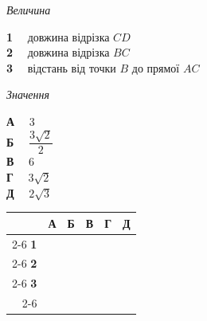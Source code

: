 \documentclass[12pt]{article}
\newcommand{\matchingGrid}{%
    \begingroup
    \renewcommand{\arraystretch}{1.15}
    \setlength{\tabcolsep}{4pt}
    \footnotesize
    \begin{tabular}{r|c|c|c|c|c|}
         \multicolumn{1}{c}{} & \multicolumn{1}{c}{\textbf{А}} & \multicolumn{1}{c}{\textbf{Б}} & \multicolumn{1}{c}{\textbf{В}} & \multicolumn{1}{c}{\textbf{Г}} & \multicolumn{1}{c}{\textbf{Д}} \\ \cline{2-6}
         \textbf{1} & \phantom{X} & \phantom{X} & \phantom{X} & \phantom{X} & \phantom{X} \\ \cline{2-6}
         \textbf{2} & & & & & \\ \cline{2-6}
         \textbf{3} & & & & & \\ \cline{2-6}
    \end{tabular}
    \endgroup
}
\begin{document}
{\noindent
\begin{minipage}[t]{0.52\textwidth}
\textit{Величина} \par \vspace{0.2cm}
\textbf{1} \ \ довжина відрізка $CD$\\[0.25cm]
\textbf{2} \ \ довжина відрізка $BC$\\[0.25cm]
\textbf{3} \ \ відстань від точки $B$ до прямої $AC$
\end{minipage}
\begin{minipage}[t]{0.28\textwidth}
\textit{Значення} \par \vspace{0.2cm}
\textbf{А} \ \ $3$\\[0.15cm]
\textbf{Б} \ \ $\dfrac{3\sqrt{2}}{2}$\\[0.15cm]
\textbf{В} \ \ $6$\\[0.15cm]
\textbf{Г} \ \ $3\sqrt{2}$\\[0.15cm]
\textbf{Д} \ \ $2\sqrt{3}$
\end{minipage}
\hfill
\begin{minipage}[t]{0.22\textwidth}
\vspace{-0.2cm}
\begin{flushright}\matchingGrid\end{flushright}
\end{minipage}
}

\vspace{0.5cm}
\end{document}
